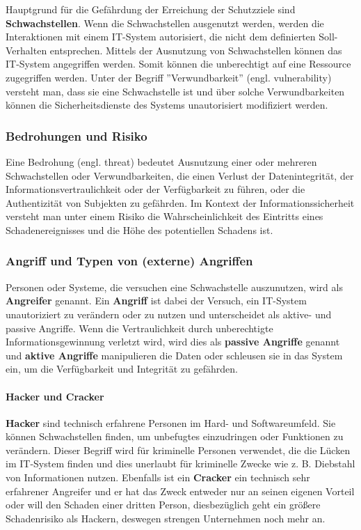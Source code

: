 Hauptgrund für die Gefährdung der Erreichung der Schutzziele sind \textbf{Schwachstellen}. Wenn die Schwachstellen ausgenutzt werden, werden die Interaktionen mit einem IT-System autorisiert, die nicht dem definierten Soll-Verhalten entsprechen. Mittels der Ausnutzung von Schwachstellen können das IT-System angegriffen werden. Somit können die unberechtigt auf eine Ressource zugegriffen werden\cite[19--20]{nowey2011einleitung}. Unter der Begriff ''Verwundbarkeit'' (engl. vulnerability) versteht man, dass sie eine Schwachstelle ist und über solche Verwundbarkeiten können die Sicherheitsdienste des Systems unautorisiert modifiziert werden\cite[38]{eckert2013sicherheit}.

\subsubsection{Bedrohungen und Risiko}

Eine Bedrohung (engl. threat) bedeutet Ausnutzung einer oder mehreren Schwachstellen oder Verwundbarkeiten, die einen Verlust der Datenintegrität, der Informationsvertraulichkeit oder der Verfügbarkeit zu führen, oder die Authentizität von Subjekten zu gefährden\cite[39]{eckert2013sicherheit}. Im Kontext der Informationssicherheit versteht man unter einem Risiko die Wahrscheinlichkeit des Eintritts eines Schadenereignisses und die Höhe des potentiellen Schadens ist\cite[15]{nowey2011einleitung}.

\subsubsection{Angriff und Typen von (externe) Angriffen}

Personen oder Systeme, die versuchen eine Schwachstelle auszunutzen, wird als \textbf{Angreifer} genannt. Ein \textbf{Angriff} ist dabei der Versuch, ein IT-System unautoriziert zu verändern oder zu nutzen und unterscheidet als aktive- und passive Angriffe. Wenn die Vertraulichkeit durch unberechtigte Informationsgewinnung verletzt wird, wird dies als \textbf{passive Angriffe} genannt und \textbf{aktive Angriffe} manipulieren die Daten oder schleusen sie in das System ein, um die Verfügbarkeit und Integrität zu gefährden\cite[20]{nowey2011einleitung}.

\paragraph{Hacker und Cracker}\mbox{}

\textbf{Hacker} sind technisch erfahrene Personen im Hard- und Softwareumfeld. Sie können Schwachstellen finden, um unbefugtes einzudringen oder Funktionen zu verändern\cite{hack17}. Dieser Begriff wird für kriminelle Personen verwendet, die die Lücken im IT-System finden und dies unerlaubt für kriminelle Zwecke wie z. B. Diebstahl von Informationen nutzen\cite{hack11}. Ebenfalls ist ein \textbf{Cracker} ein technisch sehr erfahrener Angreifer und er hat das Zweck entweder nur an seinen eigenen Vorteil oder will den Schaden einer dritten Person, diesbezüglich geht ein größere Schadenrisiko als Hackern, deswegen strengen Unternehmen noch mehr an\cite[45]{eckert2013sicherheit}.


